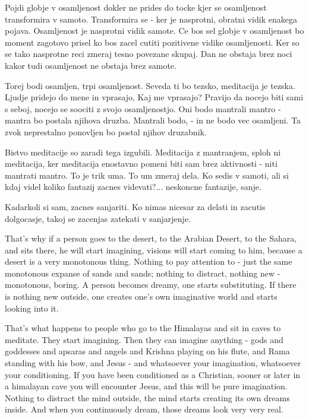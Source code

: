 Pojdi globje v osamljenost dokler ne prides do tocke kjer se osamljenost transformira v samoto. Transformira se - ker je nasprotni, obratni vidik enakega pojava. Osamljenost je nasprotni vidik samote. Ce bos sel globje v osamljenost bo moment zagotovo prisel ko bos zacel cutiti pozitivene vidike osamljenosti. Ker so se tako nasprotne reci zmeraj tesno povezane skupaj. Dan ne obstaja brez noci kakor tudi osamljenost ne obstaja brez samote. 

Torej bodi osamljen, trpi osamljenost. Seveda ti bo tezsko, meditacija je tezska. Ljudje pridejo do mene in vprasajo,  Kaj me vprasajo? Pravijo da nocejo biti sami s seboj, nocejo se soociti z svojo osamljenostjo. Oni bodo mantrali mantro - mantra bo postala njihova druzba. Mantrali bodo,  - in ne bodo vec osamljeni. Ta zvok  neprestalno ponovljen bo postal njihov druzabnik. 

Bistvo meditacije so zaradi tega izgubili. Meditacija z mantranjem, sploh ni meditacija, ker meditacija enostavno pomeni biti sam brez aktivnosti - niti mantrati mantro. To je trik uma. To um zmeraj dela. Ko sedis v samoti, ali si kdaj videl koliko fantazij zacnes videvati?... neskoncne fantazije, sanje. 

Kadarkoli si sam, zacnes sanjariti. Ko nimas nicesar za delati in zacutis dolgocasje, takoj se zacenjas zatekati v sanjarjenje. 

That's why if a person goes to the desert, to the Arabian Desert, to the Sahara, and sits there, he will start imagining, visions will start coming to him, because a desert is a very monotonous thing. Nothing to pay attention to - just the same monotonous expanse of sands and sands; nothing to distract, nothing new - monotonous, boring. A person becomes dreamy, one starts substituting. If there is nothing new outside, one creates one's own imaginative world and starts looking into it. 

That's what happens to people who go to the Himalayas and sit in caves to meditate. They start imagining. Then they can imagine anything - gods and goddesses and apsaras and angels and Krishna playing on his flute, and Rama standing with his bow, and Jesus - and whatsoever your imagination, whatsoever your conditioning. If you have been conditioned as a Christian, sooner or later in a himalayan cave you will encounter Jesus, and this will be pure imagination. Nothing to distract the mind outside, the mind starts creating its own dreams inside. And when you continuously dream, those dreams look very very real. 

